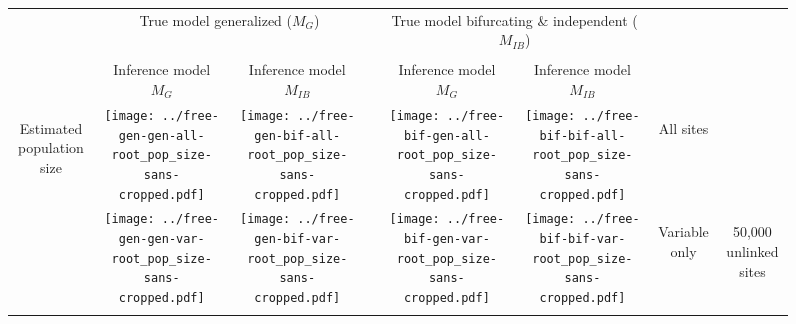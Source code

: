 \documentclass[border=10pt,varwidth=30cm]{standalone}
\newcommand{\genmodel}{\ensuremath{M_{G}}\xspace}
\newcommand{\bimodel}{\ensuremath{M_{IB}}\xspace}
\begin{document}
\begin{figure}
    \setlength\arrayrulewidth{2pt}
    \centering
    \begin{tabular}{@{}cccccccc@{}}
        & \multicolumn{2}{c}{\LARGE True model generalized (\genmodel)}
        &
        & \multicolumn{2}{c}{\LARGE True model bifurcating \& independent (\bimodel)}
        &
        & \\[1ex]
        \cline{2-3}\cline{5-6}
        & & & & & & & \\
        & \multirow{1}{0.19\textwidth}{\centering\Large Inference model \genmodel}
        & \multirow{1}{0.19\textwidth}{\centering\Large Inference model \bimodel}
        &
        & \multirow{1}{0.19\textwidth}{\centering\Large Inference model \genmodel}
        & \multirow{1}{0.19\textwidth}{\centering\Large Inference model \bimodel}
        &
        & \\[4ex]
        \multirow{5}{*}[-8em]{\begin{sideways}\Large Estimated population size\end{sideways}}
        & \texttt{[image: ../free-gen-gen-all-root\_pop\_size-sans-cropped.pdf]}
        & \texttt{[image: ../free-gen-bif-all-root\_pop\_size-sans-cropped.pdf]}
        &
        & \texttt{[image: ../free-bif-gen-all-root\_pop\_size-sans-cropped.pdf]}
        & \texttt{[image: ../free-bif-bif-all-root\_pop\_size-sans-cropped.pdf]}
        & \multicolumn{1}{c|}{\multirow{1}{*}[9em]{\begin{sideways}\Large All sites\end{sideways}}}
        & \\
        & \texttt{[image: ../free-gen-gen-var-root\_pop\_size-sans-cropped.pdf]}
        & \texttt{[image: ../free-gen-bif-var-root\_pop\_size-sans-cropped.pdf]}
        &
        & \texttt{[image: ../free-bif-gen-var-root\_pop\_size-sans-cropped.pdf]}
        & \texttt{[image: ../free-bif-bif-var-root\_pop\_size-sans-cropped.pdf]}
        & \multicolumn{1}{c|}{\multirow{1}{*}[10em]{\begin{sideways}\Large Variable only\end{sideways}}}
        & \multirow{2}{*}[19em]{\begin{sideways}\LARGE 50,000 unlinked sites\end{sideways}} \\
        & & & & & & & \\

\end{tabular}
\end{figure}
\end{document}
